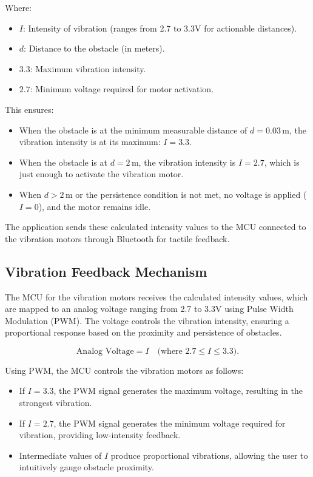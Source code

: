 Where:
\begin{itemize}
	\item \(I\): Intensity of vibration (ranges from 2.7 to 3.3V for actionable distances).
	\item \(d\): Distance to the obstacle (in meters).
	\item \(3.3\): Maximum vibration intensity.
	\item \(2.7\): Minimum voltage required for motor activation.
\end{itemize}

This ensures:
\begin{itemize}
	\item When the obstacle is at the minimum measurable distance of \(d = 0.03 \, \text{m}\), the vibration intensity is at its maximum: \(I = 3.3\).
	\item When the obstacle is at \(d = 2 \, \text{m}\), the vibration intensity is \(I = 2.7\), which is just enough to activate the vibration motor.
	\item When \(d > 2 \, \text{m}\) or the persistence condition is not met, no voltage is applied (\(I = 0\)), and the motor remains idle.
\end{itemize}

The application sends these calculated intensity values to the MCU connected to the vibration motors through Bluetooth for tactile feedback.

\subsection{Vibration Feedback Mechanism}

The MCU for the vibration motors receives the calculated intensity values, which are mapped to an analog voltage ranging from 2.7 to 3.3V using Pulse Width Modulation (PWM). The voltage controls the vibration intensity, ensuring a proportional response based on the proximity and persistence of obstacles.

\[
\text{Analog Voltage} = I \quad \text{(where \(2.7 \leq I \leq 3.3\))}.
\]

Using PWM, the MCU controls the vibration motors as follows:
\begin{itemize}
	\item If \(I = 3.3\), the PWM signal generates the maximum voltage, resulting in the strongest vibration.
	\item If \(I = 2.7\), the PWM signal generates the minimum voltage required for vibration, providing low-intensity feedback.
	\item Intermediate values of \(I\) produce proportional vibrations, allowing the user to intuitively gauge obstacle proximity.
\end{itemize}

